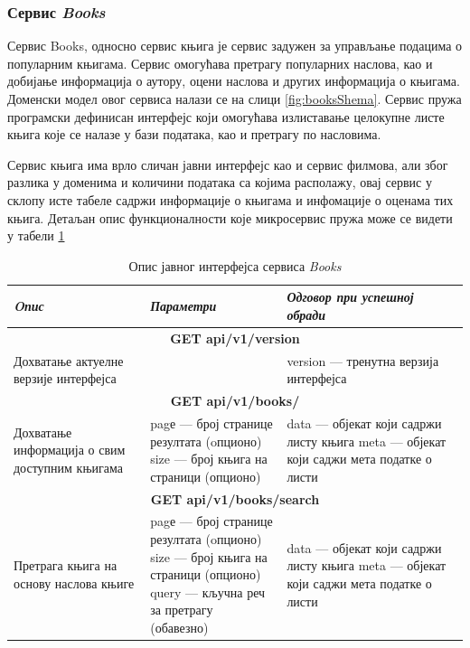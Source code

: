 \documentclass[12pt,oneside]{memoir}
\begin{document}
\newpage

\subsubsection{Сервис \textit{Books}}

Сервис Books, односно сервис књига је сервис задужен за управљање подацима о популарним књигама. Сервис омогућава претрагу популарних наслова, као и добијање информација о аутору, оцени наслова и других информација о књигама. Доменски модел овог сервиса налази се на слици \ref{fig:booksShema}. 
Сервис пружа програмски дефинисан интерфејс који омогућава излиставање целокупне листе књига које се налазе у бази података, као и претрагу по насловима.
\newpage

Сервис књига има врло сличан јавни интерфејс као и сервис филмова, али због разлика у доменима и количини података са којима располажу, овај сервис у склопу исте табеле садржи информације о књигама и инфомације о оценама тих књига. Детаљан опис функционалности које микросервис пружа може се видети у табели \ref{tbl:booksAPI}


\begin{table}
\caption{Опис јавног интерфејса сервиса \textit{Books}}
\label{tbl:booksAPI}
\begin{tabular}{ |  p{0.3\linewidth} | p{0.3\linewidth}|  p{0.4\linewidth} | }
\hline
\textit{Oпис} & \textit{Параметри} & \textit{Одговор при успешној обради} \\
\hline
\multicolumn{3}{|c|}{\textbf{GET api/v1/version}} \\
\hline
Дохватање актуелне верзије интерфејса & & 
version --- тренутна верзија интерфејса \\
\hline
\multicolumn{3}{|c|}{\textbf{GET api/v1/books/}} \\
\hline
Дохватање информација о свим доступним књигама & 
pagе --- број странице резултата (oпционо) \newline 
size --- број књига на страници (опционо)
& 
data --- објекат који садржи листу књига \newline
meta --- објекат који саджи мета податке о листи \\
\hline
\multicolumn{3}{|c|}{\textbf{GET api/v1/books/search}} \\
\hline
Претрага књига на основу наслова књиге &
pagе --- број странице резултата (oпционо) \newline 
size --- број књига на страници (опционо) \newline 
query --- кључна реч за претрагу (обавезно) 
  & 
data --- објекат који садржи листу књига \newline
meta --- објекат који саджи мета податке о листи \\
\hline
\end{tabular}
\end{table}
\end{document}
